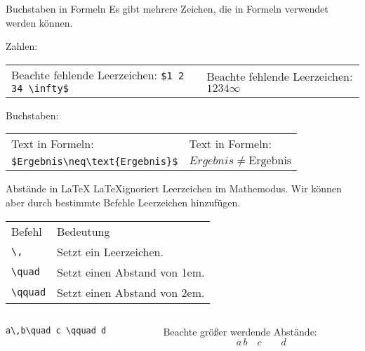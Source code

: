 \begin{frame}[fragile]{Buchstaben in Formeln}
Es gibt mehrere Zeichen, die in Formeln verwendet werden können. 

Zahlen: 
\begin{center}
\begin{tabular}{p{}p{}}
Beachte fehlende Leerzeichen: \verb+$1 2 34 \infty$+ & Beachte fehlende Leerzeichen: $1 2 34 \infty$
\end{tabular}
\end{center}
Buchstaben:
\begin{center}
\begin{tabular}{p{}p{}}
Text in Formeln:   & Text in Formeln:  \\
\verb+$Ergebnis\neq\text{Ergebnis}$+ & $Ergebnis\neq\text{Ergebnis}$
\end{tabular}
\end{center}
\end{frame}

\begin{frame}[fragile]{Abstände in \LaTeX}
\LaTeX ignoriert Leerzeichen im Mathemodus. Wir können aber durch bestimmte Befehle Leerzeichen hinzufügen.\pause
\begin{center}
\begin{tabular}{p{}p{}}
Befehl & Bedeutung\\
\verb+\,+ & Setzt ein Leerzeichen. \\
\verb+\quad+ & Setzt einen Abstand von 1em. \\
\verb+\qquad+ & Setzt einen Abstand von 2em.
\end{tabular}
\end{center}\pause
\begin{columns}
\begin{column}{0.4\textwidth}
\begin{codeblock}
\begin{verbatim}
a\,b\quad c \qquad d
\end{verbatim}
\end{codeblock}
\end{column}
\begin{column}{0.35\textwidth}
Beachte größer werdende Abstände: 
\[
a\,b\quad c \qquad d
\]
\end{column}
\end{columns}
\end{frame}

